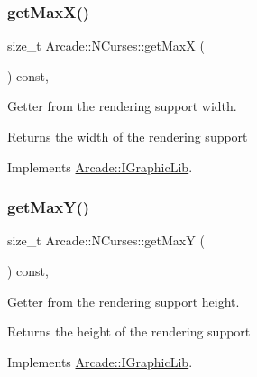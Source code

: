 \subsubsection{\texorpdfstring{get\+Max\+X()}{getMaxX()}}
{\footnotesize\ttfamily size\+\_\+t Arcade\+::\+N\+Curses\+::get\+MaxX (\begin{DoxyParamCaption}{ }\end{DoxyParamCaption}) const\hspace{0.3cm}{\ttfamily [final]}, {\ttfamily [virtual]}}



Getter from the rendering support width. 

\begin{DoxyReturn}{Returns}
the width of the rendering support 
\end{DoxyReturn}


Implements \hyperlink{class_arcade_1_1_i_graphic_lib_a41a3c00970ecd16e1893105de2091a55}{Arcade\+::\+I\+Graphic\+Lib}.

\mbox{\label{class_arcade_1_1_n_curses_a00c879117a1de6752acd376bfd59e94d}} 
\subsubsection{\texorpdfstring{get\+Max\+Y()}{getMaxY()}}
{\footnotesize\ttfamily size\+\_\+t Arcade\+::\+N\+Curses\+::get\+MaxY (\begin{DoxyParamCaption}{ }\end{DoxyParamCaption}) const\hspace{0.3cm}{\ttfamily [final]}, {\ttfamily [virtual]}}



Getter from the rendering support height. 

\begin{DoxyReturn}{Returns}
the height of the rendering support 
\end{DoxyReturn}


Implements \hyperlink{class_arcade_1_1_i_graphic_lib_ae8701e702b51189c84b1900dd624912e}{Arcade\+::\+I\+Graphic\+Lib}.

\mbox{\label{class_arcade_1_1_n_curses_a8674fcd61c00e65897db3435f31dfcc2}} 
